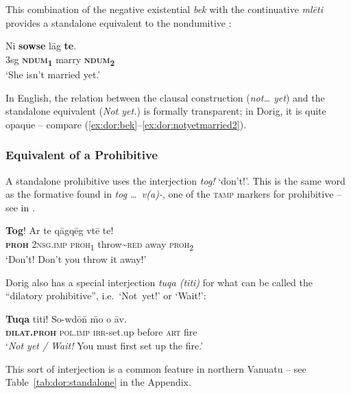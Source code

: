 \documentclass[output=paper,colorlinks,citecolor=brown,draft]{langscibook}
\begin{document}
This combination of the negative existential \textit{bek} with the continuative \textit{mlēti} provides a standalone equivalent to the nondumitive :


\ea\label{ex:dor:notyetmarried2} 
    \gll  Ni \textbf{sowse} lāg \textbf{te}.\\ 
          \textsc{3}sg \textbf{\textsc{ndum}\textsubscript{1}} marry \textbf{\textsc{ndum}\textsubscript{2}} \\
    \glt ‘She isn’t married yet.’
\z 


\noindent In English, the relation between the clausal construction (\textit{not… yet}) and the standalone equivalent (\textit{Not yet.}) is formally transparent; in Dorig, it is quite opaque – compare (\ref{ex:dor:bek}--\ref{ex:dor:notyetmarried2}).

\subsubsection{Equivalent of a Prohibitive}\label{sec:dor:3.1.3}

A standalone prohibitive uses the interjection  \textit{tog!} ‘don’t!’. This is the same word as the formative found in \textit{tog \ldots\ v(a)-}, one of the \textsc{tamp} markers for prohibitive – see  in .

\ea\label{ex:dor:throw} 
    \gll  \textbf{Tog}! Ar te qāgqēg vtē te!\\ 
      \textbf{\textsc{proh}} \textsc{2nsg}.\textsc{imp} \textsc{proh\textsubscript{1}} throw{\textasciitilde}\textsc{red} away \textsc{proh\textsubscript{2}}\\
    \glt ‘Don’t! Don’t you throw it away!’  
\z 

Dorig also has a special interjection  \textit{tuqa (titi)} for what can be called the “dilatory prohi\-bi\-tive”, i.e.~‘Not~yet!’ or ‘Wait!’:

\ea\label{ex:dor:tuqatiti} 
    \gll \textbf{Tuqa} titi! So-wdō\={n} \={m}o o āv. \\ 
          \textbf{\textsc{dilat.proh}} \textsc{pol.imp} \textsc{irr-}set.up before \textsc{art} fire\\
    \glt ‘\textit{Not yet / Wait!} You must first set up the fire.’  
\z 

\noindent This sort of interjection is a common feature in northern Vanuatu – see Table~\ref{tab:dor:standalone} in the Appendix.
\end{document}
